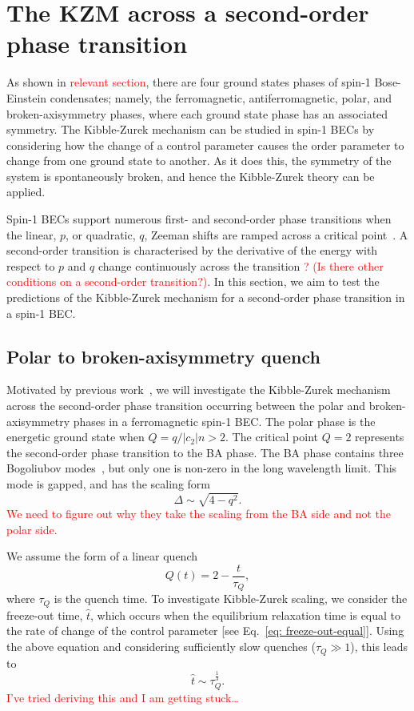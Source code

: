 \section{The KZM across a second-order phase transition}
As shown in \textcolor{red}{relevant section}, there are four ground states
phases of spin-1 Bose-Einstein condensates; namely, the ferromagnetic,
antiferromagnetic, polar, and broken-axisymmetry phases, where each ground
state phase has an associated symmetry.
The Kibble-Zurek mechanism can be studied in spin-1 BECs by considering how
the change of a control parameter causes the order parameter to change from
one ground state to another.
As it does this, the symmetry of the system is spontaneously broken, and hence
the Kibble-Zurek theory can be applied.

Spin-1 BECs support numerous first- and second-order phase transitions
when the linear, \( p \), or quadratic, \( q \), Zeeman shifts are
ramped across a critical point~\cite{Kawaguchi2012}.
A second-order transition is characterised by the derivative of the energy with
respect to \( p \) and \( q \) change continuously across the transition
\textcolor{red}{? (Is there other conditions on a second-order transition?)}.
In this section, we aim to test the predictions of the Kibble-Zurek mechanism
for a second-order phase transition in a spin-1 BEC\@.

\subsection{Polar to broken-axisymmetry quench}
Motivated by previous work~\cite{Damski2007}, we will investigate the
Kibble-Zurek mechanism across the second-order phase transition occurring
between the polar and broken-axisymmetry phases in a ferromagnetic spin-1 BEC\@.
The polar phase is the energetic ground state when \( Q=q/|c_2|n > 2 \).
The critical point \( Q = 2 \) represents the second-order phase transition to
the BA phase.
The BA phase contains three Bogoliubov modes~\cite{Uchino2010}, but only one
is non-zero in the long wavelength limit.
This mode is gapped, and has the scaling form
\begin{equation}
    \Delta \sim \sqrt{4 - q^2}.
\end{equation}
\textcolor{red}{We need to figure out why they take the scaling from the BA side
    and not the polar side.}

We assume the form of a linear quench
\begin{equation}
    Q(t) = 2 - \frac{t}{\tau_Q},
    \label{eq: time-dep-Q-damski}
\end{equation}
where \( \tau_Q \) is the quench time.
To investigate Kibble-Zurek scaling, we consider the freeze-out time,
\( \hat{t} \), which occurs when the equilibrium relaxation time is equal to the
rate of change of the control parameter [see Eq.~\eqref{eq: freeze-out-equal}].
Using the above equation and considering sufficiently slow quenches
(\(\tau_Q \gg 1\)), this leads to
\begin{equation}
    \hat{t} \sim \tau_Q^{\frac{1}{3}}.
\end{equation}
\textcolor{red}{I've tried deriving this and I am getting stuck\ldots}

